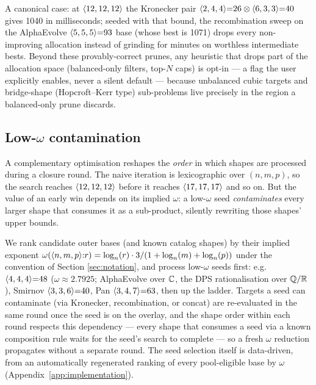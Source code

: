 A canonical case: at \(\langle 12, 12, 12 \rangle\) the Kronecker pair
\(\langle 2, 4, 4 \rangle{=}26 \otimes \langle 6, 3, 3 \rangle{=}40\) gives 1040 in
milliseconds; seeded with that bound, the recombination sweep on the
AlphaEvolve \(\langle 5, 5, 5 \rangle{=}93\) base (whose best is 1071) drops
every non-improving allocation instead of grinding for minutes on
worthless intermediate bests. Beyond these provably-correct prunes, any
heuristic that drops part of the allocation space (balanced-only
filters, top-\(N\) caps) is opt-in --- a flag the user explicitly
enables, never a silent default --- because unbalanced cubic targets and
bridge-shape (Hopcroft--Kerr type) sub-problems live precisely in the
region a balanced-only prune discards.

\subsection{Low-\(\omega\) contamination}\label{ssec:omega-contamination}

A complementary optimisation reshapes the \emph{order} in which
shapes are processed during a closure round. The naive iteration is
lexicographic over \((n, m, p)\), so the search reaches
\(\langle 12, 12, 12 \rangle\) before it reaches \(\langle 17, 17, 17 \rangle\)
and so on. But the value of an early win depends on its implied
\(\omega\): a low-\(\omega\) seed \emph{contaminates} every larger shape
that consumes it as a sub-product, silently rewriting those shapes'
upper bounds.

We rank candidate outer bases (and known catalog shapes) by their
implied exponent
\(\omega(\langle n, m, p \rangle{:}r) = \log_n(r) \cdot 3 / (1 + \log_n(m)
+ \log_n(p))\)
under the convention of Section \ref{sec:notation}, and process
low-\(\omega\) seeds first: e.g.\
\(\langle 4, 4, 4 \rangle{=}48\) (\(\omega \approx 2.7925\); AlphaEvolve
over \(\mathbb{C}\), the DPS rationalisation \cite{dps2025} over
\(\mathbb{Q}/\mathbb{R}\)), Smirnov \(\langle 3, 3, 6 \rangle{=}40\), Pan
\(\langle 3, 4, 7 \rangle{=}63\), then up the ladder. Targets a seed can
contaminate (via Kronecker, recombination, or concat) are re-evaluated
in the same round once the seed is on the overlay, and the shape order
within each round respects this dependency --- every shape that
consumes a seed via a known composition rule waits for the seed's
search to complete --- so a fresh \(\omega\) reduction propagates
without a separate round. The seed selection itself is data-driven, from
an automatically regenerated ranking of every pool-eligible base by
\(\omega\) (Appendix~\ref{app:implementation}).
